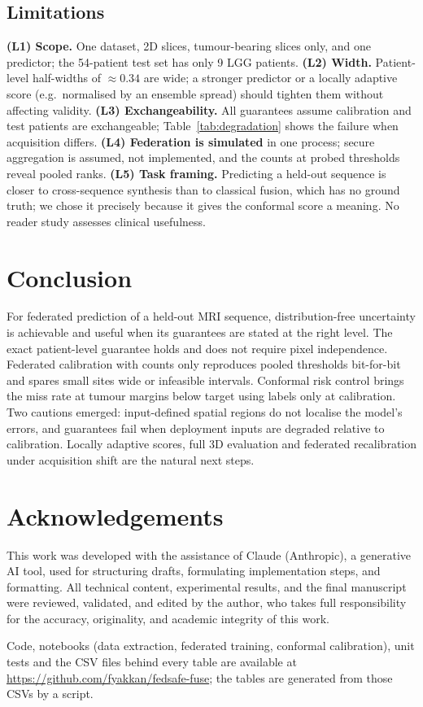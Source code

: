 \documentclass[conference]{IEEEtran}
\begin{document}
\subsection{Limitations}
\label{ssec:limitations}
\textbf{(L1) Scope.} One dataset, 2D slices, tumour-bearing slices only, and one predictor; the 54-patient test set has only 9 LGG patients. \textbf{(L2) Width.} Patient-level half-widths of $\approx0.34$ are wide; a stronger predictor or a locally adaptive score (e.g.\ normalised by an ensemble spread) should tighten them without affecting validity. \textbf{(L3) Exchangeability.} All guarantees assume calibration and test patients are exchangeable; Table~\ref{tab:degradation} shows the failure when acquisition differs. \textbf{(L4) Federation is simulated} in one process; secure aggregation is assumed, not implemented, and the counts at probed thresholds reveal pooled ranks. \textbf{(L5) Task framing.} Predicting a held-out sequence is closer to cross-sequence synthesis than to classical fusion, which has no ground truth; we chose it precisely because it gives the conformal score a meaning. No reader study assesses clinical usefulness.

\section{Conclusion}
\label{sec:conclusion}

For federated prediction of a held-out MRI sequence, distribution-free uncertainty is achievable and useful when its guarantees are stated at the right level. The exact patient-level guarantee holds and does not require pixel independence. Federated calibration with counts only reproduces pooled thresholds bit-for-bit and spares small sites wide or infeasible intervals. Conformal risk control brings the miss rate at tumour margins below target using labels only at calibration. Two cautions emerged: input-defined spatial regions do not localise the model's errors, and guarantees fail when deployment inputs are degraded relative to calibration. Locally adaptive scores, full 3D evaluation and federated recalibration under acquisition shift are the natural next steps.

\section*{Acknowledgements}
This work was developed with the assistance of Claude (Anthropic), a generative AI tool, used for structuring drafts, formulating implementation steps, and formatting. All technical content, experimental results, and the final manuscript were reviewed, validated, and edited by the author, who takes full responsibility for the accuracy, originality, and academic integrity of this work.

Code, notebooks (data extraction, federated training, conformal calibration), unit tests and the CSV files behind every table are available at \url{https://github.com/fyakkan/fedsafe-fuse}; the tables are generated from those CSVs by a script.



\end{document}
